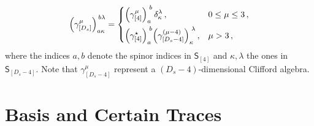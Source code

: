 \begin{equation}\label{eqn:cliffordrecursion}
  \qty(\gamma_{[D_s]}^\mu)_{a\kappa}^{\,b\lambda}  =
  \begin{dcases}
    \qty(\gamma_{[4]}^\mu)_a^{\;b} \, \delta_\kappa^\lambda\,, &  0\le\mu \le 3 \,,\\
    \qty(\gamma^{\star}_{[4]})_a^{\;b} \qty(\gamma_{[D_s-4]}^{(\mu-4)})_\kappa^{\;\lambda}\,, & \mu>3 \,,
  \end{dcases}
\end{equation}
where the indices $a,b$ denote the spinor indices in $\mathsf{S}_{[4]}$ and $\kappa,\lambda$ the ones in $\mathsf{S}_{[D_s - 4]}$.
Note that $\gamma^\mu_{[D_s-4]}$ represent a $(D_s-4)$-dimensional Clifford algebra.

\section{Basis and Certain Traces}
\label{sec:identities}

